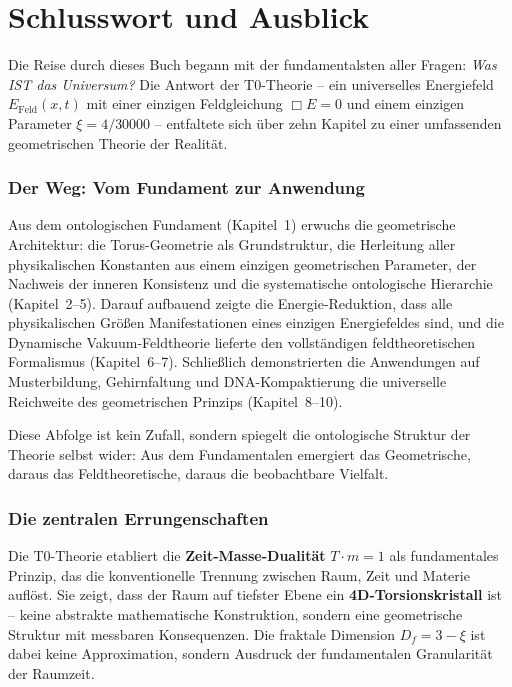 \documentclass[11pt,openright,twoside]{book}
\begin{document}
\backmatter

\chapter*{Schlusswort und Ausblick}

Die Reise durch dieses Buch begann mit der fundamentalsten aller Fragen: \textit{Was IST das Universum?} Die Antwort der T0-Theorie -- ein universelles Energiefeld $E_{\text{Feld}}(x,t)$ mit einer einzigen Feldgleichung $\Box E = 0$ und einem einzigen Parameter $\xi = 4/30000$ -- entfaltete sich über zehn Kapitel zu einer umfassenden geometrischen Theorie der Realität.

\subsection*{Der Weg: Vom Fundament zur Anwendung}

Aus dem ontologischen Fundament (Kapitel~1) erwuchs die geometrische Architektur: die Torus-Geometrie als Grundstruktur, die Herleitung aller physikalischen Konstanten aus einem einzigen geometrischen Parameter, der Nachweis der inneren Konsistenz und die systematische ontologische Hierarchie (Kapitel~2--5). Darauf aufbauend zeigte die Energie-Reduktion, dass alle physikalischen Größen Manifestationen eines einzigen Energiefeldes sind, und die Dynamische Vakuum-Feldtheorie lieferte den vollständigen feldtheoretischen Formalismus (Kapitel~6--7). Schließlich demonstrierten die Anwendungen auf Musterbildung, Gehirnfaltung und DNA-Kompaktierung die universelle Reichweite des geometrischen Prinzips (Kapitel~8--10).

Diese Abfolge ist kein Zufall, sondern spiegelt die ontologische Struktur der Theorie selbst wider: Aus dem Fundamentalen emergiert das Geometrische, daraus das Feldtheoretische, daraus die beobachtbare Vielfalt.

\subsection*{Die zentralen Errungenschaften}

Die T0-Theorie etabliert die \textbf{Zeit-Masse-Dualität} $T \cdot m = 1$ als fundamentales Prinzip, das die konventionelle Trennung zwischen Raum, Zeit und Materie auflöst. Sie zeigt, dass der Raum auf tiefster Ebene ein \textbf{4D-Torsionskristall} ist -- keine abstrakte mathematische Konstruktion, sondern eine geometrische Struktur mit messbaren Konsequenzen. Die fraktale Dimension $D_f = 3 - \xi$ ist dabei keine Approximation, sondern Ausdruck der fundamentalen Granularität der Raumzeit.
\end{document}
